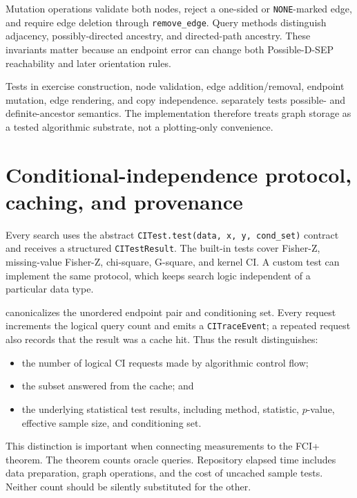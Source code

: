\documentclass[11pt,a4paper,oneside]{report}
\newcommand{\code}[1]{\texttt{#1}}
\begin{document}
Mutation operations validate both nodes, reject a one-sided or
\code{NONE}-marked edge, and require edge deletion through
\code{remove\_edge}.  Query methods distinguish adjacency,
possibly-directed ancestry, and directed-path ancestry.  These invariants
matter because an endpoint error can change both Possible-D-SEP reachability
and later orientation rules.

Tests in  exercise construction, node validation,
edge addition/removal, endpoint mutation, edge rendering, and copy
independence.   separately tests possible- and
definite-ancestor semantics.  The implementation therefore treats graph
storage as a tested algorithmic substrate, not a plotting-only convenience.

\section{Conditional-independence protocol, caching, and provenance}

Every search uses the abstract \code{CITest.test(data, x, y, cond\_set)}
contract and receives a structured \code{CITestResult}.  The built-in tests
cover Fisher-Z, missing-value Fisher-Z, chi-square, G-square, and kernel CI.
A custom test can implement the same protocol, which keeps search logic
independent of a particular data type.

 canonicalizes the unordered endpoint pair and conditioning
set.  Every request increments the logical query count and emits a
\code{CITraceEvent}; a repeated request also records that the result was a
cache hit.  Thus the result distinguishes:

\begin{itemize}[leftmargin=2em]
  \item the number of logical CI requests made by algorithmic control flow;
  \item the subset answered from the cache; and
  \item the underlying statistical test results, including method, statistic,
        \(p\)-value, effective sample size, and conditioning set.
\end{itemize}

This distinction is important when connecting measurements to the FCI+
theorem.  The theorem counts oracle queries.  Repository elapsed time includes
data preparation, graph operations, and the cost of uncached sample tests.
Neither count should be silently substituted for the other.
\end{document}

